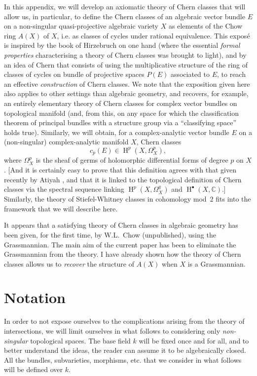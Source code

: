 \documentclass{article}
\theoremstyle{plain}
\theoremstyle{definition}
\DeclareMathOperator{\HH}{H}
\newcommand{\oldpage}[1]{\marginpar{\footnotesize$\Big\vert$ \textit{p.~#1}}}
\begin{document}
\oldpage{137}
In this appendix, we will develop an axiomatic theory of Chern classes that will allow us, in particular, to define the Chern classes of an algebraic vector bundle $E$ on a non-singular quasi-projective algebraic variety $X$ as elements of the Chow ring $A(X)$ of $X$, i.e. as classes of cycles under rational equivalence.
This expos\'{e} is inspired by the book of Hirzebruch on one hand (where the essential \emph{formal properties} characterising a theory of Chern classes was brought to light), and by an idea of Chern \cite{2} that consists of using the multiplicative structure of the ring of classes of cycles on bundle of projective spaces $P(E)$ associated to $E$, to reach an effective \emph{construction} of Chern classes.
We note that the exposition given here also applies to other settings than algebraic geometry, and recovers, for example, an entirely elementary theory of Chern classes for complex vector bundles on topological manifold (and, from this, on any space for which the classification theorem of principal bundles with a structure group via a ``classifying space'' holds true).
Similarly, we will obtain, for a complex-analytic vector bundle $E$ on a (non-singular) complex-analytic manifold $X$, Chern classes
\[
  c_p(E) \in \HH^p(X,\Omega_X^p),
\]
where $\Omega_X^p$ is the sheaf of germs of holomorphic differential forms of degree $p$ on $X$.
[And it is certainly easy to prove that this definition agrees with that given recently by Atiyah \cite{1}, and that it is linked to the topological definition of Chern classes via the spectral sequence linking $\HH^p(X,\Omega_X^q)$ and $\HH^\bullet(X,\mathbb{C})$.]
Similarly, the theory of
\oldpage{138}
Stiefel-Whitney classes in cohomology mod~$2$ fits into the framework that we will describe here.

It appears that a satisfying theory of Chern classes in algebraic geometry has been given, for the first time, by W.L.~Chow (unpublished), using the Grassmannian.
The main aim of the current paper has been to eliminate the Grassmannian from the theory.
I have already shown \cite{4} how the theory of Chern classes allows us to \emph{recover} the structure of $A(X)$ when $X$ is a Grassmannian.


\section{Notation}
\label{section1}

In order to not expose ourselves to the complications arising from the theory of intersections, we will limit ourselves in what follows to considering only \emph{non-singular} topological spaces.
The base field $k$ will be fixed once and for all, and to better understand the ideas, the reader can assume it to be algebraically closed.
All the bundles, subvarieties, morphisms, etc. that we consider in what follows will be defined over $k$.
\end{document}
